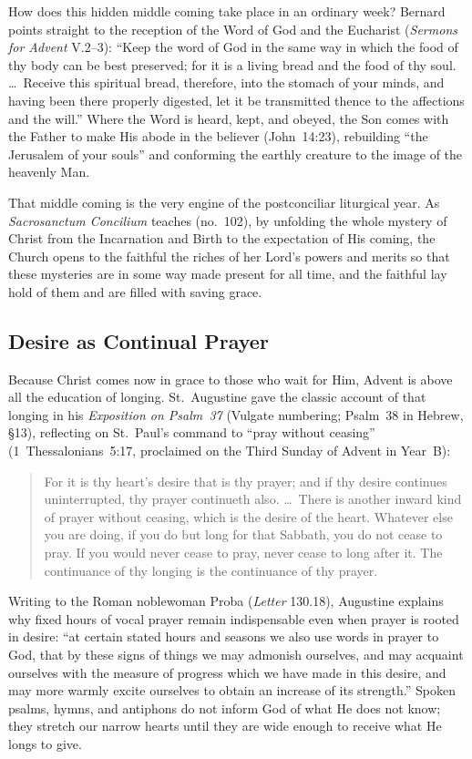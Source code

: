 How does this hidden middle coming take place in an ordinary week? Bernard points straight to the reception of the Word of God and the Eucharist (\textit{Sermons for Advent} V.2--3): ``Keep the word of God in the same way in which the food of thy body can be best preserved; for it is a living bread and the food of thy soul. \dots\ Receive this spiritual bread, therefore, into the stomach of your minds, and having been there properly digested, let it be transmitted thence to the affections and the will.'' Where the Word is heard, kept, and obeyed, the Son comes with the Father to make His abode in the believer (John~14:23), rebuilding ``the Jerusalem of your souls'' and conforming the earthly creature to the image of the heavenly Man.

That middle coming is the very engine of the postconciliar liturgical year. As \textit{Sacrosanctum Concilium} teaches (no.~102), by unfolding the whole mystery of Christ from the Incarnation and Birth to the expectation of His coming, the Church opens to the faithful the riches of her Lord's powers and merits so that these mysteries are in some way made present for all time, and the faithful lay hold of them and are filled with saving grace.

\subsection{Desire as Continual Prayer}

Because Christ comes now in grace to those who wait for Him, Advent is above all the education of longing. St.~Augustine gave the classic account of that longing in his \textit{Exposition on Psalm~37} (Vulgate numbering; Psalm~38 in Hebrew, \S13), reflecting on St.~Paul's command to ``pray without ceasing'' (1~Thessalonians~5:17, proclaimed on the Third Sunday of Advent in Year~B):

\begin{quote}
For it is thy heart's desire that is thy prayer; and if thy desire continues uninterrupted, thy prayer continueth also. \dots\ There is another inward kind of prayer without ceasing, which is the desire of the heart. Whatever else you are doing, if you do but long for that Sabbath, you do not cease to pray. If you would never cease to pray, never cease to long after it. The continuance of thy longing is the continuance of thy prayer.
\end{quote}

Writing to the Roman noblewoman Proba (\textit{Letter} 130.18), Augustine explains why fixed hours of vocal prayer remain indispensable even when prayer is rooted in desire: ``at certain stated hours and seasons we also use words in prayer to God, that by these signs of things we may admonish ourselves, and may acquaint ourselves with the measure of progress which we have made in this desire, and may more warmly excite ourselves to obtain an increase of its strength.'' Spoken psalms, hymns, and antiphons do not inform God of what He does not know; they stretch our narrow hearts until they are wide enough to receive what He longs to give.

